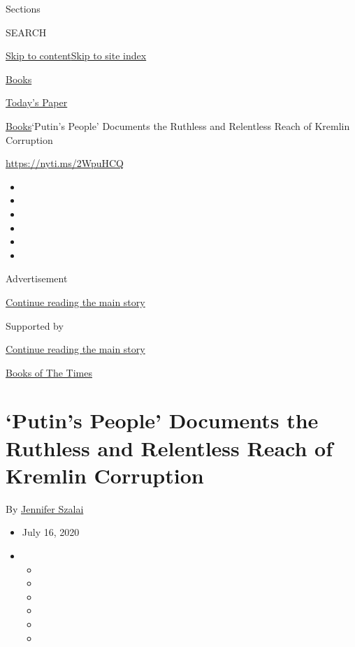 Sections

SEARCH

\protect\hyperlink{site-content}{Skip to
content}\protect\hyperlink{site-index}{Skip to site index}

\href{https://www.nytimes3xbfgragh.onion/section/books}{Books}

\href{https://myaccount.nytimes3xbfgragh.onion/auth/login?response_type=cookie\&client_id=vi}{}

\href{https://www.nytimes3xbfgragh.onion/section/todayspaper}{Today's
Paper}

\href{/section/books}{Books}\textbar{}`Putin's People' Documents the
Ruthless and Relentless Reach of Kremlin Corruption

\url{https://nyti.ms/2WpuHCQ}

\begin{itemize}
\item
\item
\item
\item
\item
\item
\end{itemize}

Advertisement

\protect\hyperlink{after-top}{Continue reading the main story}

Supported by

\protect\hyperlink{after-sponsor}{Continue reading the main story}

\href{/column/books-of-the-times}{Books of The Times}

\hypertarget{putins-people-documents-the-ruthless-and-relentless-reach-of-kremlin-corruption}{%
\section{`Putin's People' Documents the Ruthless and Relentless Reach of
Kremlin
Corruption}\label{putins-people-documents-the-ruthless-and-relentless-reach-of-kremlin-corruption}}

By \href{https://www.nytimes3xbfgragh.onion/by/jennifer-szalai}{Jennifer
Szalai}

\begin{itemize}
\item
  July 16, 2020
\item
  \begin{itemize}
  \item
  \item
  \item
  \item
  \item
  \item
  \end{itemize}
\end{itemize}

